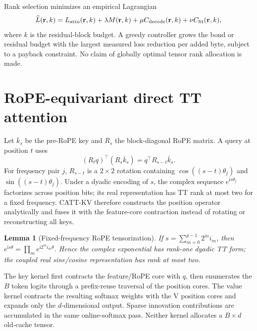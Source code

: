 \documentclass[11pt]{article}
\newtheorem{lemma}{Lemma}
\begin{document}
Rank selection minimizes an empirical Lagrangian
\[
\widehat L(\mathbf r,k)=L_{\rm attn}(\mathbf r,k)
+\lambda M(\mathbf r,k)+\mu C_{\rm decode}(\mathbf r,k)+\nu C_{\rm fit}(\mathbf r,k),
\]
where $k$ is the residual-block budget. A greedy controller grows the bond or residual budget with
the largest measured loss reduction per added byte, subject to a payback constraint. No claim of
globally optimal tensor rank allocation is made.

\section{RoPE-equivariant direct TT attention}
\label{sec:direct}

Let $\bar k_s$ be the pre-RoPE key and $R_s$ the block-diagonal RoPE matrix. A query at position
$t$ uses
\[
(R_tq)^\top(R_s\bar k_s)=q^\top R_{s-t}\bar k_s.
\]
For frequency pair $j$, $R_{s-t}$ is a $2\times2$ rotation containing
$\cos((s-t)\theta_j)$ and $\sin((s-t)\theta_j)$. Under a dyadic encoding of $s$, the complex
sequence $e^{\mathrm i s\theta_j}$ factorizes across position bits; its real representation has
TT rank at most two for a fixed frequency. CATT-KV therefore constructs the position operator
analytically and fuses it with the feature-core contraction instead of rotating or reconstructing
all keys.

\begin{lemma}[Fixed-frequency RoPE tensorization]
If $s=\sum_{m=0}^{p-1}2^mi_m$, then
$e^{\mathrm i s\theta}=\prod_m e^{\mathrm i2^mi_m\theta}$. Hence the complex exponential has
rank-one dyadic TT form; the coupled real sine/cosine representation has rank at most two.
\end{lemma}

The key kernel first contracts the feature/RoPE core with $q$, then enumerates the $B$ token logits
through a prefix-reuse traversal of the position cores. The value kernel contracts the resulting
softmax weights with the V position cores and expands only the $d$-dimensional output. Sparse
innovation contributions are accumulated in the same online-softmax pass. Neither kernel allocates
a $B\times d$ old-cache tensor.
\end{document}
